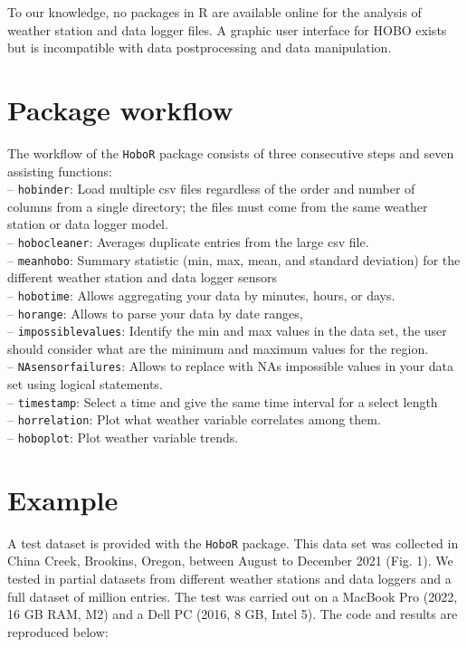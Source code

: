 \documentclass[11pt, oneside]{article}   	%
\begin{document}
To our knowledge, no packages in R are available online for the analysis of weather station and data logger files. A graphic user interface for HOBO exists but is incompatible with data postprocessing and data manipulation. 

\section*{Package workflow}
The workflow of the \verb|HoboR| package consists of three consecutive steps and seven assisting functions: \\
– \verb|hobinder|: Load multiple csv files regardless of the order and number of columns from a single directory; the files must come from the same weather station or data logger model.   \\
–  \verb|hobocleaner|: Averages duplicate entries from the large csv file. \\
–  \verb|meanhobo|: Summary statistic (min, max, mean, and standard deviation) for the different weather station and data logger sensors \\
– \verb|hobotime|: Allows aggregating your data by minutes, hours, or days.\\
– \verb|horange|: Allows to parse your data by date ranges,\\
– \verb|impossiblevalues|: Identify the min and max values in the data set, the user should consider what are the minimum and maximum values for the region. \\
– \verb|NAsensorfailures|: Allows to replace with NAs impossible values in your data set using logical statements. \\
– \verb|timestamp|: Select a time and give the same time interval for a select length \\ 
– \verb|horrelation|: Plot what weather variable correlates among them. \\
– \verb|hoboplot|: Plot weather variable trends.\\


\section*{Example}

A test dataset is provided with the \verb|HoboR| package. This data set was collected in China Creek, Brookins, Oregon, between August to December 2021 (Fig. 1). We tested in partial datasets from different weather stations and data loggers and a full dataset of million entries. The test was carried out on a MacBook Pro (2022, 16 GB RAM, M2) and a Dell PC (2016, 8 GB, Intel 5). The code and results are reproduced below:
\end{document}
